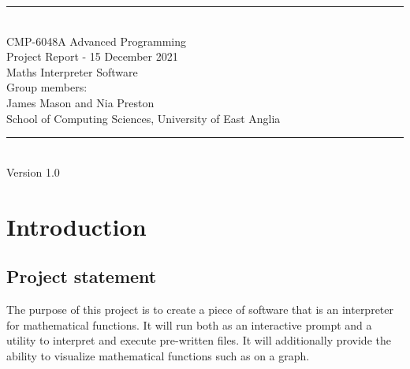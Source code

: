 \documentclass[a4paper, oneside, 11pt]{report}
\begin{document}
\begin{titlepage}
\begin{center}
\rule{12cm}{1mm} \\
\vspace{1cm}
{\large  CMP-6048A Advanced Programming}
\vspace{7.5cm}
\\{\Large Project Report - 15 December 2021}
\vspace{1.5cm}
\\{\LARGE Maths Interpreter Software}
\vspace{1.0cm}
\\{\Large Group members: \\ James Mason and Nia Preston}
\vspace{10.0cm}
\\{\large School of Computing Sciences, University of East Anglia}
\\ \rule{12cm}{0.5mm}
\\ \hspace{8.5cm} {\large Version 1.0}
\end{center}
\end{titlepage}


\setcounter{page}{1}


\begin{abstract}
In this project, our aim was to create a maths-based interpreter, capable of a range of useful mathematical operations outlined by the project brief.
This includes expression evaluation and function graphing via abstract syntax tree based interpretation. The abstract syntax tree allows the correct precedence when interpreting based on the depth of the node in the tree. Each node within the tree, implements a visitor pattern allowing further abstraction and generalization within the interpreter. We used a scrum based development methodology to develop our language in sprints, allowing us to evolve our program over time with frequent re-adjustment of requirements and functionality.


and what your final results are, your final outcome or deliverable and conclusion.
\end{abstract}

\chapter{Introduction}
\label{chap:intro}


\section{Project statement}
The purpose of this project is to create a piece of software that is an interpreter for mathematical functions. It will run both as an interactive prompt and a utility to interpret and execute pre-written files.
It will additionally provide the ability to visualize mathematical functions such as on a graph.
\end{document}
